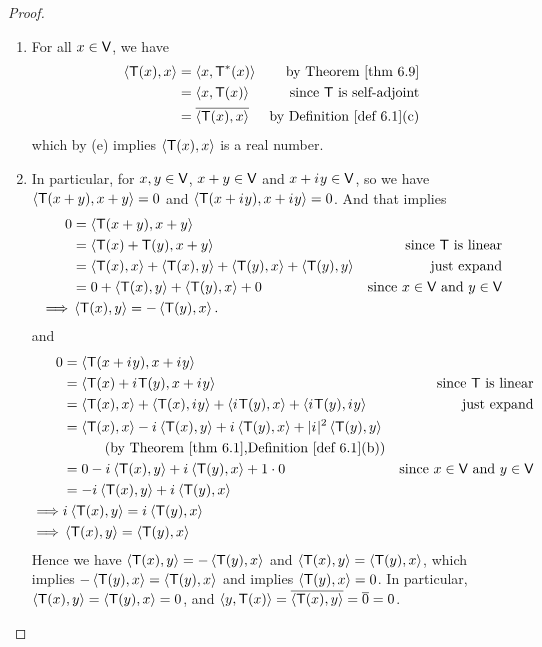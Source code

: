 \begin{proof} \ 

\begin{enumerate}
\item For all \(x \in \textsf{V}\), we have
\begin{align*}
    \LG \T(x), x \RG & = \LG x, \T^*(x) \RG & \text{by \THM{6.9}} \\
        & = \LG x, \T(x) \RG & \text{since \(\T\) is self-adjoint} \\
        & = \conjugatet{\LG \T(x), x \RG} & \text{by \DEF{6.1}(c)}
\end{align*}
which by (e) implies \(\left< \textsf{T}(x), x \right>\) is a real number.

\item In particular, for \(x, y \in \textsf{V}\), \(x + y \in \textsf{V}\) and \(x + {i\mkern1mu} y \in \textsf{V}\), so we have \(\left< \textsf{T}(x + y), x + y \right> = 0\) and \(\left< \textsf{T}(x + {i\mkern1mu} y), x + {i\mkern1mu} y \right> = 0\).
And that implies
\begin{align*}
    0 & = \left< \textsf{T}(x + y), x + y \right> \\
      & = \left< \textsf{T}(x) + \textsf{T}(y), x + y \right> & \text{since \(\textsf{T}\) is linear} \\
      & = \left< \textsf{T}(x), x \right> + \left< \textsf{T}(x), y \right> + \left< \textsf{T}(y), x \right> + \left< \textsf{T}(y), y \right> & \text{just expand} \\
      & = 0 + \left< \textsf{T}(x), y \right> + \left< \textsf{T}(y), x \right> + 0 & \text{since \(x \in \textsf{V}\) and \(y \in \textsf{V}\)} \\
    \implies & \left< \textsf{T}(x), y \right> = -\left< \textsf{T}(y), x \right>.
\end{align*}
and
\begin{align*}
    0 & = \LG \T(x + \iu y), x + \iu y \RG \\
      & = \LG \T(x) + \iu \T(y), x + \iu y \RG & \text{since \(\T\) is linear} \\
      & = \LG \T(x), x \RG + \LG \T(x), \iu y \RG + \LG \iu \T(y), x \RG + \LG \iu \T(y), \iu y \RG & \text{just expand} \\
      & = \LG \T(x), x \RG - \iu \LG \T(x), y \RG + \iu \LG \T(y), x \RG + \abs{\iu}^2 \LG \T(y), y \RG \\
      & \quad \quad \quad \text{(by \THM{6.1},\DEF{6.1}(b))} \\
      & = 0 - \iu \LG \T(x), y \RG + \iu \LG \T(y), x \RG + 1 \cdot 0 & \text{since \(x \in \V\) and \(y \in \V\)} \\
      & = -\iu \LG \T(x), y \RG + \iu \LG \T(y), x \RG \\
    \implies & \iu \LG \T(x), y \RG = \iu \LG \T(y), x \RG \\
    \implies & \LG \T(x), y \RG = \LG \T(y), x \RG
\end{align*}
Hence we have \(\left< \textsf{T}(x), y \right> = -\left< \textsf{T}(y), x \right>\) and \(\left< \textsf{T}(x), y \right> = \left< \textsf{T}(y), x \right>\), which implies \(-\left< \textsf{T}(y), x \right> = \left< \textsf{T}(y), x \right>\) and implies \(\left< \textsf{T}(y), x \right> = 0\). 
In particular, \(\left< \textsf{T}(x), y \right> = \left< \textsf{T}(y), x \right> = 0\), and \(\left< y, \textsf{T}(x) \right> = \overline{\left< \textsf{T}(x), y \right>} = \overline{0} = 0\).


\end{enumerate}
\end{proof}
